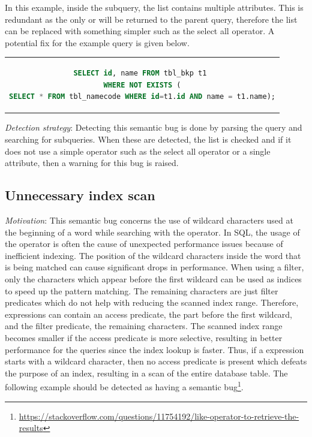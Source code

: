 In this example, inside the  subquery, the  list contains multiple attributes. This is redundant as the only  or  will be returned to the parent query, therefore the  list can be replaced with something simpler such as the select all operator. A potential fix for the example query is given below.

\begin{center}
\begin{tabular}{c}
\begin{lstlisting}[language=SQL]
SELECT id, name FROM tbl_bkp t1 
WHERE NOT EXISTS (
SELECT * FROM tbl_namecode WHERE id=t1.id AND name = t1.name);
\end{lstlisting}
\end{tabular}
\end{center}

\noindent \emph{Detection strategy}: Detecting this semantic bug is done by parsing the query and searching for  subqueries. When these are detected, the  list is checked and if it does not use a simple operator such as the select all operator or a single attribute, then a warning for this bug is raised.

\subsection{Unnecessary index scan}
\emph{Motivation}: This semantic bug concerns the use of wildcard characters used at the beginning of a word while searching with the  operator. In SQL, the usage of the  operator is often the cause of unexpected performance issues because of inefficient indexing. The position of the wildcard characters inside the word that is being matched can cause significant drops in performance. When using a  filter, only the characters which appear before the first wildcard can be used as indices to speed up the pattern matching. The remaining characters are just filter predicates which do not help with reducing the scanned index range. Therefore,  expressions can contain an access predicate, the part before the first wildcard, and the filter predicate, the remaining characters. The scanned index range becomes smaller if the access predicate is more selective, resulting in better performance for the queries since the index lookup is faster. Thus, if a  expression starts with a wildcard character, then no access predicate is present which defeats the purpose of an index, resulting in a scan of the entire database table. The following example should be detected as having a semantic bug\footnote{\url{https://stackoverflow.com/questions/11754192/like-operator-to-retrieve-the-results}}.


